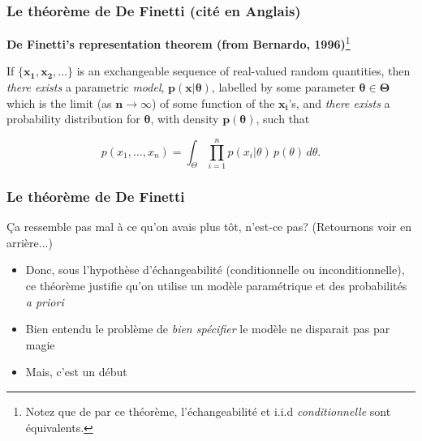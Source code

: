 \documentclass{beamer}
\begin{document}
\begin{frame}
    \frametitle{Le théorème de De Finetti (cité en Anglais)}

    \vfill
    
    \textbf{De Finetti's representation theorem (from Bernardo, 1996)}\footnote{
    Notez que de par ce théorème, l'échangeabilité et i.i.d \emph{conditionnelle} sont équivalents.}

    \pause

    \vfill


    If $\boldsymbol{\{x_1, x_2, \ldots\}}$ is an exchangeable sequence of real-valued random quantities, \pause
    then \emph{there exists} a parametric \emph{model}, $\boldsymbol{p(x | \theta)}$, labelled by some
    parameter $\boldsymbol{\theta \in \Theta}$ which is the limit (as $\boldsymbol{n \to \infty}$)
    of some function of the $\boldsymbol{x_i}$'s, \pause and \emph{there exists} a probability distribution
    for $\boldsymbol{\theta}$, with density $\boldsymbol{p(\theta)}$, such that \pause

    \[p(x_1, \ldots, x_n) = \int_{\Theta} \prod_{i = 1}^{n} p(x_i | \theta) \, p(\theta) \, d\theta.\]
\end{frame}


\begin{frame}
    \frametitle{Le théorème de De Finetti}
    Ça ressemble pas mal à ce qu'on avais plus tôt, n'est-ce pas? (Retournons voir en arrière...)

    \pause

    \vfill

    \begin{itemize}
      \item Donc, sous l'hypothèse d'échangeabilité (conditionnelle ou inconditionnelle), ce théorème justifie
            qu'on utilise un modèle paramétrique et des probabilités \emph{a priori}
      \pause
      \item Bien entendu le problème de \emph{bien spécifier} le modèle ne disparait pas par magie
      \pause
      \item Mais, c'est un début
    \end{itemize}
\end{frame}
\end{document}
